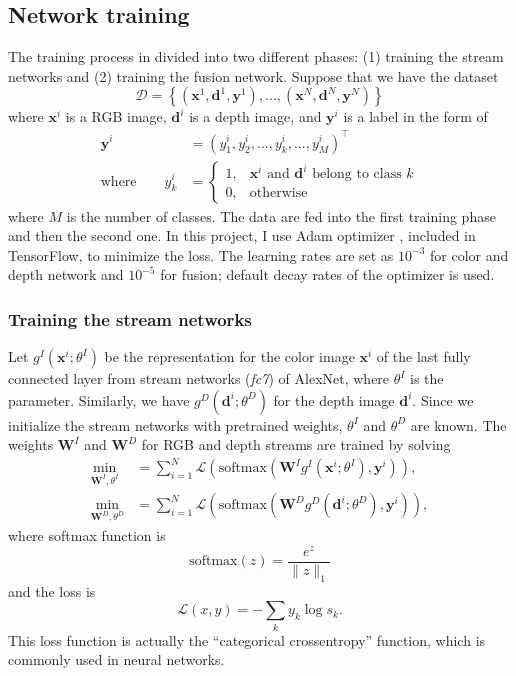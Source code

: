 \subsection{Network training}\label{sec:training}
The training process in divided into two different phases: (1) training the stream networks and (2) training the fusion network. Suppose that we have the dataset
\begin{equation}
	\mathcal{D} = \left\{ \left(\mathbf{x}^1, \mathbf{d}^1, \mathbf{y}^1\right), ..., \left(\mathbf{x}^N, \mathbf{d}^N, \mathbf{y}^N\right) \right\}
\end{equation}
where $\mathbf{x}^i$ is a RGB image, $\mathbf{d}^i$ is a depth image, and $\mathbf{y}^i$ is a label in the form of
\begin{align}
	\label{equ:label}
	\mathbf{y}^i &= (y_1^i, y_2^i, ..., y_k^i, ..., y_{M}^i)^\top \\
	\text{where} \qquad y_k^i &= 
	\begin{cases}
	1, & \mathbf{x}^i \text{ and } \mathbf{d}^i \text{ belong to class } k\\
	0, & \text{otherwise}
	\end{cases}
\end{align}
where $M$ is the number of classes. The data are fed into the first training phase and then the second one. In this project, I use Adam optimizer \cite{tensorflow2015-whitepaper}\cite{KingmaB14_adam}, included in TensorFlow, to minimize the loss. The learning rates are set as $10^{-3}$ for color and depth network and $10^{-5}$ for fusion; default decay rates of the optimizer is used.

\subsubsection{Training the stream networks}
Let $g^I(\mathbf{x}^i; \theta^I)$ be the representation for the color image $\mathbf{x}^i$ of the last fully connected layer from stream networks (\textit{fc7}) of AlexNet, where $\theta^I$ is the parameter. Similarly, we have $g^D(\mathbf{d}^i; \theta^D)$ for the depth image $\mathbf{d}^i$. Since we initialize the stream networks with pretrained weights, $\theta^I$ and $\theta^D$ are known. The weights $\mathbf{W}^I$ and $\mathbf{W}^D$ for RGB and depth streams are trained by solving
\begin{align}
	\min_{\mathbf{W}^I,\theta^I} &= \sum_{i=1}^N \mathcal{L} \left( \text{softmax}\left(\mathbf{W}^I g^I \left(\mathbf{x}^i; \theta^I\right), \mathbf{y}^i\right)\right), \\
	\min_{\mathbf{W}^D,\theta^D} &= \sum_{i=1}^N \mathcal{L} \left( \text{softmax}\left(\mathbf{W}^D g^D \left(\mathbf{d}^i; \theta^D\right), \mathbf{y}^i\right)\right),
\end{align}
where softmax function is
\begin{equation}
	\text{softmax}(z) =\frac{e^z}{\lVert z \rVert_1}
\end{equation}
and the loss is
\begin{equation}
	\mathcal{L}(x,y) = -\sum_k y_k \log s_k.
\end{equation}
This loss function is actually the ``categorical crossentropy'' function, which is commonly used in neural networks.

